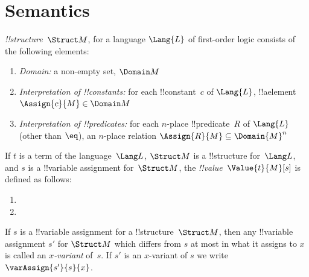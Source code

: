 \documentclass[../../../../include/open-logic-chapter]{subfiles}
\begin{document}

\section{Semantics}

\begin{defn}[!!^{structure}s]
 \emph{!!{structure}}~$\Struct M$, for a language
$\Lang{L}$ of first-order logic consists of the following elements:
\begin{enumerate}
\item \emph{Domain:} a non-empty set, $\Domain M$
\item \emph{Interpretation of !!{constant}s:} for each !!{constant}~$c$ of
  $\Lang{L}$, !!a{element} $\Assign{c}{M} \in \Domain M$
\item \emph{Interpretation of !!{predicate}s:} for each $n$-place
  !!{predicate}~$R$ of $\Lang{L}$ (other than $\eq$), an $n$-place
  relation $\Assign{R}{M} \subseteq \Domain{M}^n$
\end{enumerate}
\end{defn}

\begin{defn}
If $t$ is a term of the language~$\Lang L$, $\Struct M$ is a
!!{structure} for~$\Lang L$, and $s$ is a !!{variable} assignment
for~$\Struct M$, the \emph{!!{value}}~$\Value{t}{M}[s]$ is defined as
follows:
\begin{enumerate}
\item {}
\item {}
\end{enumerate}
\end{defn}

\begin{defn}[$x$-Variant]
If $s$ is a !!{variable} assignment for a !!{structure}~$\Struct M$, then any
!!{variable} assignment $s'$ for $\Struct M$ which differs from $s$ at most
in what it assigns to $x$ is called an \emph{$x$-variant} of~$s$.  If
$s'$ is an $x$-variant of $s$ we write $\varAssign{s'}{s}{x}$.
\end{defn}
\end{document}
